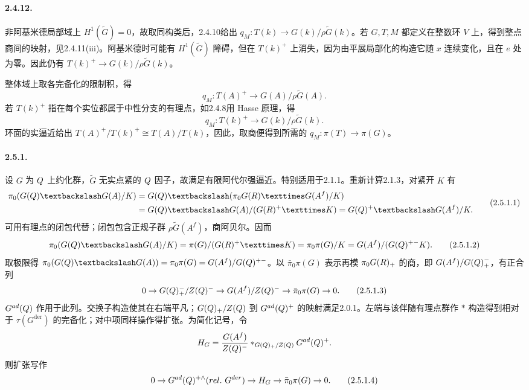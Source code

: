 \paragraph*{2.4.12.} 非阿基米德局部域上 $H^1(\widetilde G)=0$，故取同构类后，2.4.10给出 $q_M:T(k)\to G(k)/\rho\widetilde G(k)$。若 $G,T,M$ 都定义在整数环 $V$ 上，得到整点商间的映射，见2.4.11(iii)。阿基米德时可能有 $H^1(\widetilde G)$ 障碍，但在 $T(k)^+$ 上消失，因为由平展局部化的构造它随 $x$ 连续变化，且在 $e$ 处为零。因此仍有 $T(k)^+\to G(k)/\rho\widetilde G(k)$。

整体域上取各完备化的限制积，得
\begin{equation}
 q_M:T(A)^+\longrightarrow G(A)/\rho\widetilde G(A).
 \tag{2.4.12.1}
\end{equation}
若 $T(k)^+$ 指在每个实位都属于中性分支的有理点，如2.4.8用 Hasse 原理，得
\begin{equation}
 q_M:T(k)^+\longrightarrow G(k)/\rho\widetilde G(k).
 \tag{2.4.12.2}
\end{equation}
环面的实逼近给出 $T(A)^+/T(k)^+\cong T(A)/T(k)$，因此，取商便得到所需的 $q_M:\pi(T)\to\pi(G)$。

\paragraph*{2.5.1.} 设 $G$ 为 $Q$ 上约化群，$\widetilde G$ 无实点紧的 $Q$ 因子，故满足有限阿代尔强逼近。特别适用于2.1.1。重新计算2.1.3，对紧开 $K$ 有
\begin{equation}
 \begin{split}
 \pi_0(G(\Q)\backslash G(A)/K)
 &=G(\Q)\backslash(\pi_0G(\R)\times G(A^f)/K)\\
 &=G(\Q)\backslash G(A)/(G(\R)^+\times K)
 =G(\Q)^+\backslash G(A^f)/K.
 \end{split}
 \tag{2.5.1.1}
\end{equation}
可用有理点的闭包代替；闭包包含正规子群 $\rho\widetilde G(A^f)$，商阿贝尔。因而
\begin{equation}
 \pi_0(G(\Q)\backslash G(A)/K)
 =\pi(G)/(G(\R)^+\times K)=\pi_0\pi(G)/K
 =G(A^f)/(G(\Q)^{+-}K).
 \tag{2.5.1.2}
\end{equation}
取极限得 $\pi_0(G(\Q)\backslash G(A))=\pi_0\pi(G)=G(A^f)/G(\Q)^{+-}$。以 $\bar\pi_0\pi(G)$ 表示再模 $\pi_0G(R)_+$ 的商，即 $G(A^f)/G(Q)_+^-$，有正合列
\begin{equation}
 0\to G(Q)_+^-/Z(Q)^-\to G(A^f)/Z(Q)^-\to\bar\pi_0\pi(G)\to0.
 \tag{2.5.1.3}
\end{equation}
$G^{ad}(Q)$ 作用于此列。交换子构造使其在右端平凡；$G(Q)_+/Z(Q)$ 到 $G^{ad}(Q)^+$ 的映射满足2.0.1。左端与该伴随有理点群作 $*$ 构造得到相对于 $\tau(G^{\mathrm{der}})$ 的完备化；对中项同样操作得扩张。为简化记号，令
\[
 H_G=\frac{G(A^f)}{Z(Q)^-}*_{G(Q)_+/Z(Q)}G^{ad}(Q)^+.
\]
则扩张写作
\begin{equation}
 0\to G^{ad}(Q)^{+\wedge}(rel.\ G^{der})
 \to H_G\to\bar\pi_0\pi(G)\to0.
 \tag{2.5.1.4}
\end{equation}
